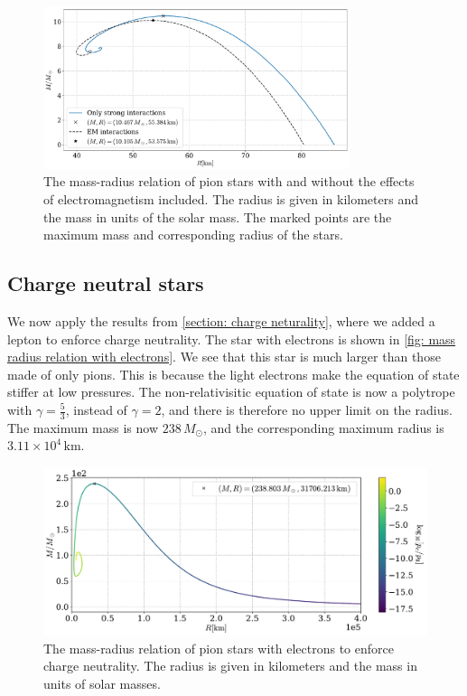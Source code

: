 \begin{figure}[!htb]
    \centering
    \includegraphics[width=0.8\textwidth]{../scripts/figurer/pion_star/mass_radius_pion_star_compare.pdf}
    \caption{
        The mass-radius relation of pion stars with and without the effects of electromagnetism included.
        The radius is given in kilometers and the mass in units of the solar mass.
        The marked points are the maximum mass and corresponding radius of the stars.
        }
        \label{fig: mass-radius relation comparison}
\end{figure}


\FloatBarrier


\subsection{Charge neutral stars}


We now apply the results from \autoref{section: charge neturality}, where we added a lepton to enforce charge neutrality.
The star with electrons is shown in  \autoref{fig: mass radius relation with electrons}.
We see that this star is much larger than those made of only pions.
This is because the light electrons make the equation of state stiffer at low pressures.
The non-relativisitic equation of state is now a polytrope with $\gamma = \frac{5}{3}$, instead of $\gamma = 2$, and there is therefore no upper limit on the radius.
The maximum mass is now $238\, M_\odot $, and the corresponding maximum radius is $ 3.11\times 10^4 \,\text{km}$.

\begin{figure}[!htb]
    \centering
    \includegraphics[width=\textwidth]{../scripts/figurer/pion_star/mass_radius__e.pdf}
    \caption{
        The mass-radius relation of pion stars with electrons to enforce charge neutrality.
        The radius is given in kilometers and the mass in units of solar masses.
        }
        \label{fig: mass radius relation with electrons}
\end{figure}


